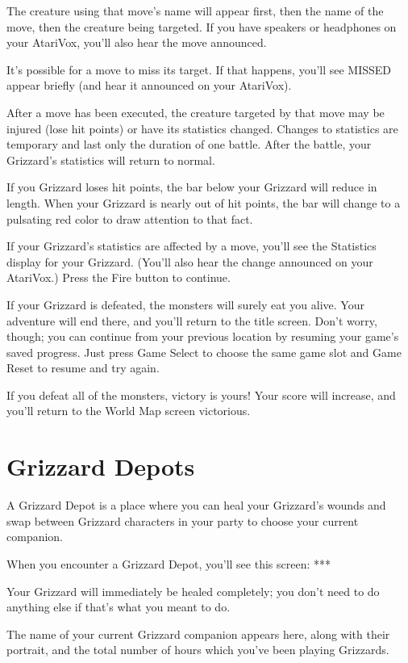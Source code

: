 \documentclass[10pt,twoside,openright]{memoir}
\begin{document}
The creature using that move's name will appear first, then the name of the
move, then the creature being targeted. If you have speakers or headphones
on your AtariVox, you'll also hear the move announced.

It's possible for a move to miss its target. If that happens, you'll see
MISSED appear briefly (and hear it announced on your AtariVox).

After a move has been executed, the creature targeted by that move may be
injured (lose hit points) or have its statistics changed. Changes to
statistics are temporary and last only the duration of one battle. After the
battle, your Grizzard's statistics will return to normal.

If you Grizzard loses hit points, the bar below your Grizzard will reduce in
length. When your Grizzard is nearly out of hit points, the bar will change
to a pulsating red color to draw attention to that fact.

If your Grizzard's statistics are affected by a move, you'll see the
Statistics display for your Grizzard. (You'll also hear the change announced
on your AtariVox.) Press the Fire button to continue.

If your Grizzard is defeated, the monsters will surely eat you alive. Your
adventure will end there, and you'll return to the title screen. Don't
worry, though; you can continue from your previous location by resuming your
game's saved progress. Just press Game Select to choose the same game slot
and Game Reset to resume and try again.

If you defeat all of the monsters, victory is yours! Your score will
increase, and you'll return to the World Map screen victorious.





\section{Grizzard Depots}

A Grizzard Depot is a place where you can heal your Grizzard's wounds and
swap between Grizzard characters in your party to choose your current
companion.

When you encounter a Grizzard Depot, you'll see this screen: ***

Your Grizzard will immediately be healed completely; you don't need to do
anything else if that's what you meant to do.

The name  of your  current Grizzard companion  appears here,  along with
their  portrait,  and  the  total  number of  hours  which  you've  been
playing Grizzards.
\end{document}
